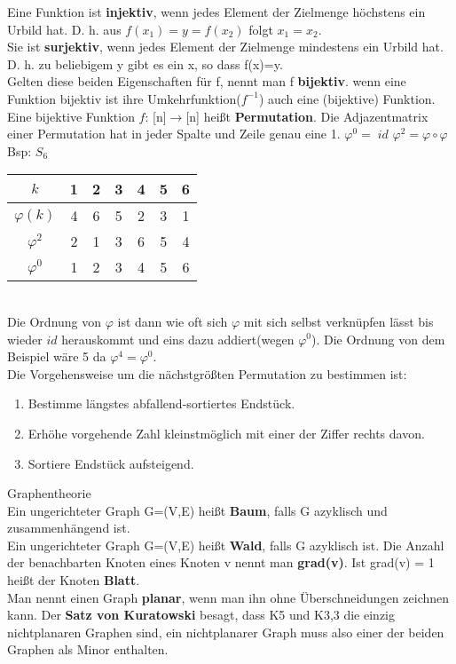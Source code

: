 \documentclass[11pt]{article}
\begin{document}
Eine Funktion ist {\bfseries injektiv}, wenn jedes Element der Zielmenge h{\"o}chstens ein Urbild hat. D. h. aus $f(x_1) = y = f(x_2)$ folgt $x_1=x_2$.\\
Sie ist {\bfseries surjektiv}, wenn jedes Element der Zielmenge mindestens ein Urbild hat. D. h. zu beliebigem y gibt es ein x, so dass f(x)=y.\\
Gelten diese beiden Eigenschaften f{\"u}r f, nennt man f {\bfseries bijektiv}. wenn eine Funktion bijektiv ist ihre Umkehrfunktion($f^{-1}$) auch eine (bijektive) Funktion.\\
Eine bijektive Funktion $f\colon\,${[}n{]}$\to${[}n{]} hei{\ss}t {\bfseries Permutation}. Die Adjazentmatrix einer Permutation hat in jeder Spalte und Zeile genau eine 1.\hspace{5mm} $\varphi ^{0} =\; id$\hspace{5mm} $\varphi ^2 = \varphi \circ \varphi$ \\
Bsp: $S_6$\\
\begin{tabular}{c|c|c|c|c|c|c}
$k$ & 1 & 2 & 3 & 4 & 5 & 6 \\ \hline
$\varphi (k)$ & 4 & 6 & 5 & 2 & 3 & 1 \\ \hline
$\varphi ^2$ & 2 & 1 & 3 & 6 & 5 & 4 \\ \hline
$\varphi ^0$ & 1 & 2 & 3 & 4 & 5 & 6 \\

\end{tabular}\\
Die Ordnung von $\varphi$ ist dann wie oft sich $\varphi$ mit sich selbst verkn{\"u}pfen l{\"a}sst bis wieder $id$ herauskommt und eins dazu addiert(wegen $\varphi ^0$). Die Ordnung von dem Beispiel w{\"a}re 5 da $\varphi ^4 = \varphi ^0$.\\
Die Vorgehensweise um die n{\"a}chstgr{\"o}{\ss}ten Permutation zu bestimmen ist:\begin{enumerate}
\item Bestimme l{\"a}ngstes abfallend-sortiertes Endst{\"u}ck.
\item Erh{\"o}he vorgehende Zahl kleinstm{\"o}glich mit einer der Ziffer rechts davon.
\item Sortiere Endst{\"u}ck aufsteigend.
\end{enumerate}


Graphentheorie\\
Ein ungerichteter Graph G=(V,E) hei{\ss}t {\bfseries Baum}, falls G azyklisch und zusammenh{\"a}ngend ist.\\
Ein ungerichteter Graph G=(V,E) hei{\ss}t {\bfseries Wald}, falls G azyklisch ist. Die Anzahl der benachbarten Knoten eines Knoten v nennt man {\bfseries grad(v)}. Ist grad(v) = 1 hei{\ss}t der Knoten {\bfseries Blatt}.  \\
Man nennt einen Graph {\bfseries planar}, wenn man ihn ohne {\"U}berschneidungen zeichnen kann. Der {\bfseries Satz von Kuratowski} besagt, dass K5 und K3,3 die einzig nichtplanaren Graphen sind, ein nichtplanarer Graph muss also einer der beiden Graphen als Minor enthalten.\\
\end{document}
